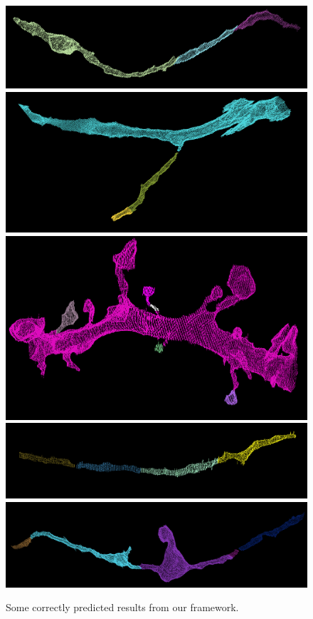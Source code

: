 \begin{figure}[t]
	\centering
	\includegraphics[width=0.85\linewidth]{./figures/multicut-correct1.png}
	\includegraphics[width=0.85\linewidth]{./figures/multicut-correct2.png}
	\includegraphics[width=0.85\linewidth]{./figures/multicut-correct3.png}
	\includegraphics[width=0.85\linewidth]{./figures/multicut-correct4.png}
	\includegraphics[width=0.85\linewidth]{./figures/multicut-correct5.png}
	\caption{Some correctly predicted results from our framework.}
	\label{fig:positive-results}
\end{figure}

